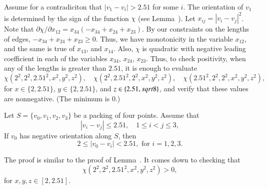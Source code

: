 \begin{tarskidata}
\begin{tarski}
\begin{proved}  
Assume for a contradiciton that $|v_1-v_i|> 2.51$ for some $i$.
The orientation of $v_1$ is determined by the sign of the function
$\chi$ (see Lemma~). 
Let $x_{ij}=|v_i-v_j|^2$.  
Note that $\partial\chi/\partial x_{12} = x_{34}
(-x_{34}+x_{24}+x_{23})$.  By our
constraints on the lengths of edges, 
$-x_{34}+x_{24}+x_{23}\ge0$. Thus, we have monotonicity in the variable $x_{12}$,
and the same is true of $x_{13}$, and $x_{14}$. Also, $\chi$ is
quadratic with negative leading coefficient in each of the
variables $x_{34}$, $x_{24}$, $x_{23}$. Thus, to check positivity, when any
of the lengths is greater than $2.51$, it is enough to evaluate
$$\chi(2^2,2^2,2.51^2,x^2,y^2,z^2), \quad
\chi(2^2,2.51^2,2^2,x^2,y^2,z^2),  \quad
\chi(2.51^2,2^2,2^2,x^2,y^2,z^2),$$ for $x\in\{2,2.51\}$,
$y\in\{2,2.51\}$, and $z\in\{2.51,sqrt8\}$, and verify that these
values are nonnegative. (The minimum is  $0$.)
\swallowed\end{proved}
\end{tarski}




\begin{tarski}

\begin{lemma} Let $S=\{v_0,v_1,v_2,v_3\}$ be a
packing of four points.  Assume that 
  $$
  |v_i-v_j|\le 2.51,\quad 1\le i < j \le 3,
  $$
 If $v_0$
has negative orientation along
$S$, then
  $$
  2 \le |v_0-v_i | < 2.51, \text{ for } i=1,2,3.
  $$
\end{lemma}

\begin{proved} The proof is similar to the proof of
Lemma~. It comes down to checking that
    $$
    \chi(2^2,2^2,2.51^2,x^2,y^2,z^2)>0,$$
    for $x,y,z\in[2,2.51]$.
\swallowed\end{proved}
\end{tarski}




\begin{tarski}


\end{tarski}
\end{tarskidata}
